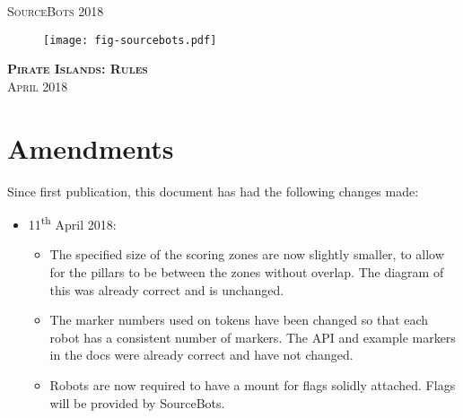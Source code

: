 \documentclass[twoside,12pt,a4paper,titlepage]{article}
\title{\gamename}
\author{\org}
\date{\timeline}
\newcommand{\org}{SourceBots\xspace}
\newcommand{\gamename}{Pirate Islands\xspace}
\newcommand{\timeline}{April 2018\xspace}
\begin{document}
\begin{titlepage}
\begin{center}
\textsc{\large SourceBots 2018}\\[3.5cm]
\begin{figure}
    \centering
    \texttt{[image: fig-sourcebots.pdf]}
\end{figure}
\textsc{\huge \textbf{\gamename{}: Rules}}\\[1cm]
\textsc{\large \timeline}\\[3cm]
\end{center}
\end{titlepage}


\clearpage

\clearpage

\clearpage

\section{Amendments}

Since first publication, this document has had the following changes made:

\begin{itemize}
    \item 11\textsuperscript{th} April 2018:
    \begin{itemize}
        \item The specified size of the scoring zones are now slightly smaller,
              to allow for the pillars to be between the zones without overlap.
              The diagram of this was already correct and is unchanged.
        \item The marker numbers used on tokens have been changed so that each
              robot has a consistent number of markers. The API and example
              markers in the docs were already correct and have not changed.
        \item Robots are now required to have a mount for flags solidly attached.
              Flags will be provided by \org.
    \end{itemize}
\end{itemize}
\end{document}

